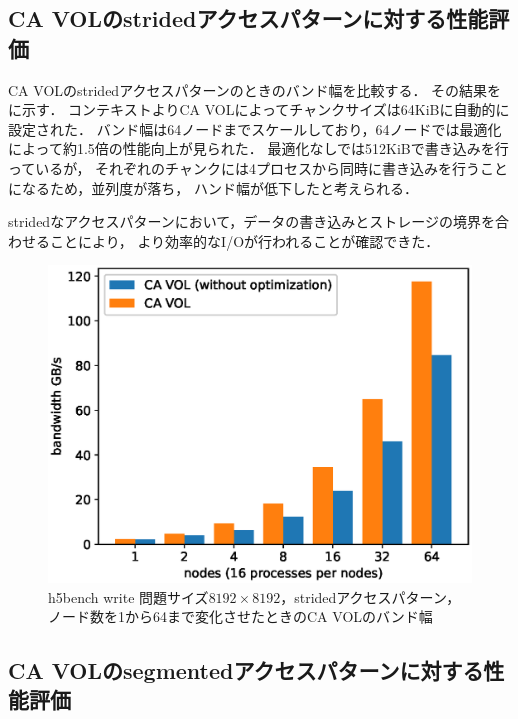\documentclass[submit,techrep,noauthor]{ipsj}
\begin{document}
\subsection{CA VOLのstridedアクセスパターンに対する性能評価}
CA VOLのstridedアクセスパターンのときのバンド幅を比較する．
その結果をに示す．
コンテキストよりCA VOLによってチャンクサイズは64KiBに自動的に設定された．
バンド幅は64ノードまでスケールしており，64ノードでは最適化によって約1.5倍の性能向上が見られた．
最適化なしでは512KiBで書き込みを行っているが，
それぞれのチャンクには4プロセスから同時に書き込みを行うことになるため，並列度が落ち，
ハンド幅が低下したと考えられる．

stridedなアクセスパターンにおいて，データの書き込みとストレージの境界を合わせることにより，
より効率的なI/Oが行われることが確認できた．

\begin{figure}[t]
	\centering
	\includegraphics[width=\linewidth]{figure/chfs_strided.eps}
	\caption{h5bench write 問題サイズ$8192 \times 8192$，stridedアクセスパターン，ノード数を1から64まで変化させたときのCA VOLのバンド幅}
	\label{fig:h5writestrided}
\end{figure}

\subsection{CA VOLのsegmentedアクセスパターンに対する性能評価}
\end{document}
